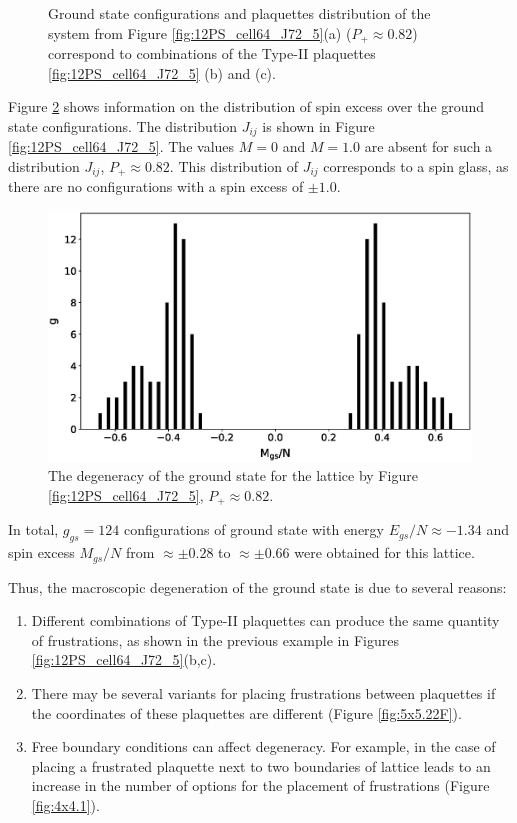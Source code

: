 \documentclass[preprint,12pt]{elsarticle}
\begin{document}
\begin{figure}[H]
\begin{minipage}[h]{0.3\linewidth}
		\end{minipage}
		\caption{Ground state configurations  and plaquettes distribution of the system from Figure \ref{fig:12PS_cell64_J72_5}(a) ($P_+\approx0.82$) correspond to combinations of the Type-II plaquettes \ref{fig:12PS_cell64_J72_5} (b) and (c).}
		\label{fig:12F_cell64_J72_5}
	\end{figure}
	
	Figure \ref{fig:g_Mgs} shows information on the distribution of spin excess over the ground state configurations. The distribution $J_{ij}$ is shown in Figure \ref{fig:12PS_cell64_J72_5}. The values $M=0$ and $M=1.0$ are absent for such a distribution $J_{ij}$, $P_+\approx0.82$. This distribution of $J_{ij}$ corresponds to a spin glass, as there are no configurations with a spin excess of $\pm1.0$.
	
	\begin{figure}[H]
		\centering
		\includegraphics[width=0.8\linewidth]{pictures/g_Mgs.eps}
		\caption{The degeneracy of the ground state for the lattice by Figure \ref{fig:12PS_cell64_J72_5}, $P_+\approx0.82$.}
		\label{fig:g_Mgs}
	\end{figure}
	
	In total, $g_{gs}=124$ configurations of ground state with energy $E_{gs}/N \approx -1.34$ and spin excess $M_{gs}/N$ from $\approx \pm 0.28$ to $\approx \pm 0.66$ were obtained for this lattice. 
	
	Thus, the macroscopic degeneration of the ground state is due to several reasons:
	
	\begin{enumerate}
		\item Different combinations of Type-II plaquettes can produce the same quantity of frustrations, as shown in the previous example in Figures \ref{fig:12PS_cell64_J72_5}(b,c).
		\item There may be several variants for placing frustrations between plaquettes if the coordinates of these plaquettes are different (Figure \ref{fig:5x5.22F}).
		\item Free boundary conditions can affect degeneracy. For example, in the case of placing a frustrated plaquette next to two boundaries of lattice leads to an increase in the number of options for the placement of frustrations (Figure \ref{fig:4x4.1}).
	\end{enumerate}
	
\end{document}
